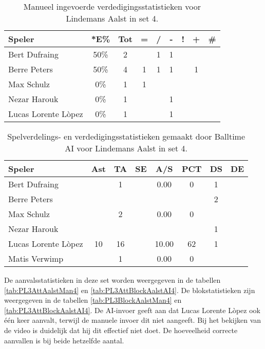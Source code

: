 \begin{table}[ht!]
    \centering
    \scriptsize
    \begin{tabular}{|l|c|c|c|c|c|c|c|c|}
        \hline
        \textbf{Speler} & *E\% & Tot & = & / & - & ! & + & \# \\ \hline
        Bert Dufraing & 50\% & 2 &  & 1 & 1 &  &  & \\ 
        Berre Peters & 50\% & 4 & 1 & 1 & 1 & & 1 &  \\ 
        Max Schulz & 0\% & 1 & 1 &  &  &  &  & \\ 
        Nezar Harouk & 0\% & 1 &  &  & 1 &  &  &  \\ 
        Lucas Lorente Lòpez & 0\% & 1 &  &  & 1 &  &  & \\ \hline
    \end{tabular}
    \caption[Manueel ingevoerde verdedigingsstatistieken voor Lindemans Aalst in set 4]{\label{tab:PL3DigAalstMan4}Manueel ingevoerde verdedigingsstatistieken voor Lindemans Aalst in set 4.}
\end{table}

\begin{table}[ht!]
  \centering
  \scriptsize
  \begin{tabular}{|l|c|c|c|c|c|c|c|} \hline
    \textbf{Speler} & Ast & TA & SE & A/S & PCT & DS &  DE \\ \hline
    Bert Dufraing &  & 1 &  & 0.00 & 0 & 1 &  \\
    Berre Peters &   &   &   &   &   & 2 &   \\
    Max Schulz &  & 2 &  & 0.00 & 0 &   &   \\
    Nezar Harouk &   &   &   &   &   &  1 &   \\
    Lucas Lorente Lòpez & 10 & 16 &  & 10.00 & 62 & 1 &  \\
    Matis Verwimp &  & 1 &  & 0.00 & 0 &   &   \\ \hline
  \end{tabular}
 \caption[Spelverdelings- en verdedigingsstatistieken gemaakt door Balltime AI voor Lindemans Aalst in set 4]{\label{tab:PL3SetDigAalstAI4}Spelverdelings- en verdedigingsstatistieken gemaakt door Balltime AI voor Lindemans Aalst in set 4.}
\end{table}

De aanvalsstatistieken in deze set worden weergegeven in de tabellen \ref{tab:PL3AttAalstMan4} en \ref{tab:PL3AttBlockAalstAI4}. De blokstatistieken zijn weergegeven in de tabellen \ref{tab:PL3BlockAalstMan4} en \ref{tab:PL3AttBlockAalstAI4}. De AI-invoer geeft aan dat Lucas Lorente Lòpez ook één keer aanvalt, terwijl de manuele invoer dit niet aangeeft. Bij het bekijken van de video is duidelijk dat hij dit effectief niet doet. De hoeveelheid correcte aanvallen is bij beide hetzelfde aantal.

